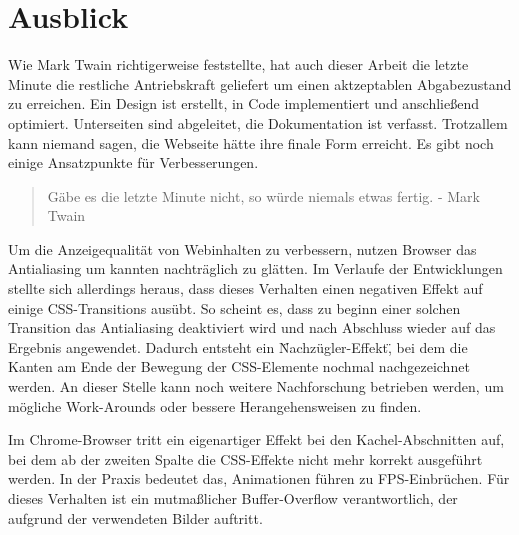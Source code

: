 \chapter{Ausblick}
Wie Mark Twain richtigerweise feststellte, hat auch dieser Arbeit die letzte Minute die restliche Antriebskraft geliefert um einen aktzeptablen Abgabezustand zu erreichen. Ein Design ist erstellt, in Code implementiert und anschließend optimiert. Unterseiten sind abgeleitet, die Dokumentation ist verfasst. Trotzallem kann niemand sagen, die Webseite hätte ihre finale Form erreicht. Es gibt noch einige Ansatzpunkte für Verbesserungen.

\begin{quote}
	Gäbe es die letzte Minute nicht, so würde niemals etwas fertig.
	- Mark Twain
\end{quote}

Um die Anzeigequalität von Webinhalten zu verbessern, nutzen Browser das Antialiasing um kannten nachträglich zu glätten. Im Verlaufe der Entwicklungen stellte sich allerdings heraus, dass dieses Verhalten einen negativen Effekt auf einige CSS-Transitions ausübt. So scheint es, dass zu beginn einer solchen Transition das Antialiasing deaktiviert wird und nach Abschluss wieder auf das Ergebnis angewendet. Dadurch entsteht ein \"Nachzügler-Effekt\", bei dem die Kanten am Ende der Bewegung der CSS-Elemente nochmal nachgezeichnet werden.
An dieser Stelle kann noch weitere Nachforschung betrieben werden, um mögliche Work-Arounds oder bessere Herangehensweisen zu finden.

Im Chrome-Browser tritt ein eigenartiger Effekt bei den Kachel-Abschnitten auf, bei dem ab der zweiten Spalte die CSS-Effekte nicht mehr korrekt ausgeführt werden. In der Praxis bedeutet das, Animationen führen zu FPS-Einbrüchen. Für dieses Verhalten ist ein mutmaßlicher Buffer-Overflow verantwortlich, der aufgrund der verwendeten Bilder auftritt.